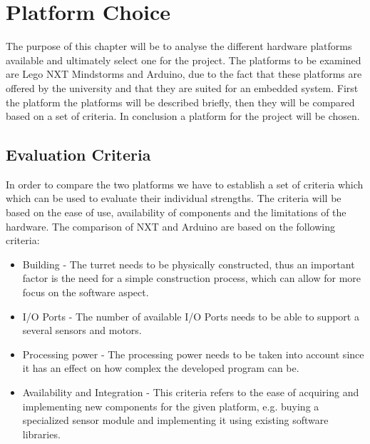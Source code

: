 \chapter{Platform Choice}\label{PlatformC}
The purpose of this chapter will be to analyse the different hardware platforms available
and ultimately select one for the project. The platforms to be examined are Lego
NXT Mindstorms and Arduino, due to the fact that these platforms are offered by
the university and that they are suited for an embedded system.
First the platform the platforms will be described briefly, then they will be
compared based on a set of criteria. In conclusion a platform for the project
will be chosen.

\section{Evaluation Criteria}\label{EvalCrit}
In order to compare the two platforms we have to establish a set of criteria
which which can be used to evaluate their individual strengths. The criteria
will be based on the ease of use, availability of components and the limitations
of the hardware. The comparison of NXT and Arduino are based on the following
criteria:

\begin{itemize}
  \item Building - The turret needs to be physically constructed, thus an
  important factor is the need for a simple construction process, which can
  allow for more focus on the software aspect.
  \item I/O Ports - The number of available I/O Ports needs to be able to
  support a several sensors and motors.
  \item Processing power - The processing power needs to be taken into account
  since it has an effect on how complex the developed program can be.
  \item Availability and Integration - This criteria refers to the ease of
  acquiring and implementing new components for the given platform, e.g. buying
  a specialized sensor module and implementing it using existing software
  libraries.
\end{itemize}

